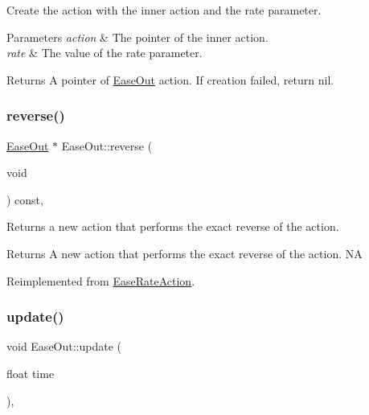 Create the action with the inner action and the rate parameter. 


\begin{DoxyParams}{Parameters}
{\em action} & The pointer of the inner action. \\
\hline
{\em rate} & The value of the rate parameter. \\
\hline
\end{DoxyParams}
\begin{DoxyReturn}{Returns}
A pointer of \hyperlink{classEaseOut}{Ease\+Out} action. If creation failed, return nil. 
\end{DoxyReturn}
\mbox{\label{classEaseOut_a6ad7b6fdd15cf8c5f1c3ad325c384f51}} 
\subsubsection{\texorpdfstring{reverse()}{reverse()}}
{\footnotesize\ttfamily \hyperlink{classEaseOut}{Ease\+Out} $\ast$ Ease\+Out\+::reverse (\begin{DoxyParamCaption}\item[{void}]{ }\end{DoxyParamCaption}) const\hspace{0.3cm}{\ttfamily [override]}, {\ttfamily [virtual]}}

Returns a new action that performs the exact reverse of the action.

\begin{DoxyReturn}{Returns}
A new action that performs the exact reverse of the action.  NA 
\end{DoxyReturn}


Reimplemented from \hyperlink{classEaseRateAction_acd2b87a3358e01fa74a726634dcd41fb}{Ease\+Rate\+Action}.

\mbox{\label{classEaseOut_a1fe43c782ff47f143ab5db00f7c76aea}} 
\subsubsection{\texorpdfstring{update()}{update()}}
{\footnotesize\ttfamily void Ease\+Out\+::update (\begin{DoxyParamCaption}\item[{float}]{time }\end{DoxyParamCaption})\hspace{0.3cm}{\ttfamily [override]}, {\ttfamily [virtual]}}

